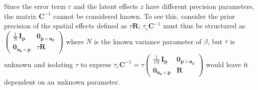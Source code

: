 \documentclass[openany, 11pt, oneside]{book}
\begin{document}
\begin{subappendices}
Since the error term $\varepsilon$ and the latent effects $z$ have different precision parameters, the matrix $\boldsymbol{C}^{-1}$ cannot be considered known. To see this, consider the prior precision of the spatial effects defined as $\tau \boldsymbol{R}$; $\tau_{\varepsilon} \boldsymbol{C}^{-1}$ must thus be structured as $\begin{pmatrix} \frac{1}{N} \, \boldsymbol{I_p} & \boldsymbol{0_{p \times n_z}} \\ \boldsymbol{0_{n_z \times p}} & \tau \boldsymbol{R} \end{pmatrix}$ where $N$ is the known variance parameter of $\beta$, but $\tau$ is unknown and isolating $\tau$ to express $\tau_{\varepsilon} \boldsymbol{C}^{-1} = \tau \begin{pmatrix}
 \frac{1}{\tau N} \, \boldsymbol{I_p} & \boldsymbol{0_{p \times n_z}} \\ \boldsymbol{0_{n_z \times p}}& \boldsymbol{R}
\end{pmatrix}$ would leave it dependent on an unknown parameter.



\end{subappendices}
\end{document}
